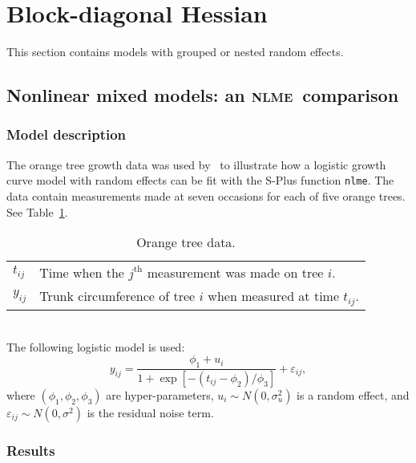 \documentclass{admbmanual}
\newcommand{\citeasnoun}{\cite}
\newcommand{\scNLME}{\textsc{nlme}}
\begin{document}
\section{Block-diagonal Hessian}

This section contains models with grouped or nested random effects.

\subsection{Nonlinear mixed models: an \scNLME\ comparison}
\label{sec:orange}

\subsubsection{Model description}

The orange tree growth data was used by~\citeasnoun[Ch.~8.2]{pinh:bate:2000} to
illustrate how a logistic growth curve model with random effects can be fit with
the S-Plus function \texttt{nlme}. The data contain measurements made at seven
occasions for each of five orange trees. See Table~\ref{tab:orange-trees}.
\begin{table}[htbp]
  \begin{center}
    \begin{tabular}{ll}
      $t_{ij}$
      & Time when the $j^{\textrm{th}}$ measurement was made on tree $i$.\\
      $y_{ij}$
      & Trunk circumference of tree $i$ when measured at time $t_{ij}$.  \\
    \end{tabular}
  \end{center}
  \caption{Orange tree data.}
  \label{tab:orange-trees}
\end{table}
\\The following logistic model is used:
\[
y_{ij}=\frac{\phi_1+u_i}{1+\exp \left[ -\left(t_{ij}-\phi_2\right)
    /\phi_3\right]}+\varepsilon_{ij},
\]%
where $(\phi_1,\phi_2,\phi_3)$ are hyper-parameters,
$u_i\sim N(0,\sigma_u^2)$ is a random effect, and
$\varepsilon_{ij}\sim N(0,\sigma^2)$ is the residual noise term.

\subsubsection{Results}
\end{document}
